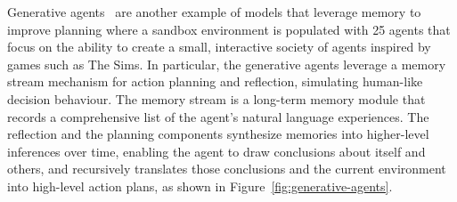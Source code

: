 Generative agents~\cite{park2023generativeagentsinteractivesimulacra} are another example of models that leverage memory to improve planning where a sandbox environment is populated with 25 agents that focus on the ability to create a small, interactive society of agents inspired by games such as The Sims.
In particular, the generative agents leverage a memory stream mechanism for action planning and reflection, simulating human-like decision behaviour.
The memory stream is a long-term memory module that records a comprehensive list of the agent’s natural language experiences.
The reflection and the planning components synthesize memories into higher-level inferences over time, enabling the agent to draw conclusions
about itself and others, and recursively translates those conclusions and the current environment into high-level action plans, as shown in Figure~\ref{fig:generative-agents}.


